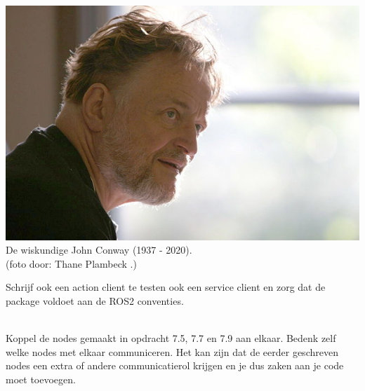 \begin{exercise}
\begin{minipage}{0.6\textwidth}
\end{minipage}\hfill 
\begin{minipage}{0.3\textwidth}
\begin{center}
\includegraphics[width=\textwidth]{Pictures/640px-John_H_Conway_2005.jpg}\\
De wiskundige John Conway (1937 - 2020).\\{\tiny(foto door: Thane Plambeck \cite{conway}.)}
\end{center}
\end{minipage}


\vspace{1cm}
\noindent Schrijf ook een action client te testen ook een service client en zorg dat de package voldoet aan de ROS2 conventies. \\

\end{exercise}

\begin{exercise}[Pijpleiding]\mbox{}\\
Koppel de nodes gemaakt in opdracht 7.5, 7.7 en 7.9 aan elkaar. Bedenk zelf welke nodes met elkaar communiceren. Het kan zijn dat de eerder geschreven nodes een extra of andere communicatierol krijgen en je dus zaken aan je code moet toevoegen.
\end{exercise}